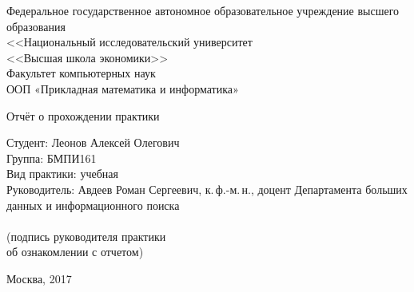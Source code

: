 \begin{titlepage}
\newpage

\begin{center}

Федеральное государственное автономное образовательное учреждение
высшего образования \\
\large{<<Национальный исследовательский университет} \\
\large{<<Высшая школа экономики>>} \\
Факультет компьютерных наук \\
ООП «Прикладная математика и информатика» \\

\hrulefill
\end{center}

\vspace{8em}

\begin{center}
\huge{Отчёт о прохождении практики \\}
\end{center}

\vspace{20em}
\begin{flushleft}
Студент: Леонов Алексей Олегович \\
Группа: БМПИ161 \\
Вид практики: учебная \\
Руководитель: Авдеев Роман Сергеевич, к.\,ф.-м.\,н., доцент Департамента больших данных и информационного поиска \\
\vspace{0.5cm}
\underline{\hspace{4cm}} \\
\small{(подпись руководителя практики\\ об ознакомлении с отчетом)}
\end{flushleft}


\vspace{\fill}

\begin{center}
Москва, 2017
\end{center}

\end{titlepage}
